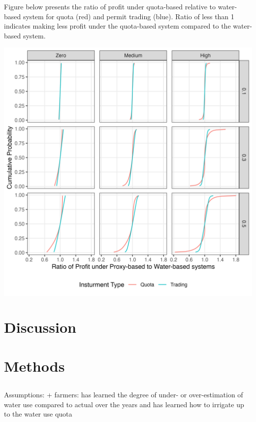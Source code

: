 \documentclass[
]{article}
\begin{document}
Figure below presents the ratio of profit under quota-based relative to water-based system for quota (red) and permit trading (blue). Ratio of less than 1 indicates making less profit under the quota-based system compared to the water-based system.

\begin{center}\includegraphics{figures/g_profit_ratio} \end{center}

\section{Discussion}\label{discussion}

\section{Methods}\label{methods}

\subsection{}\label{section}

Assumptions:
+ farmers: has learned the degree of under- or over-estimation of water use compared to actual over the years and has learned how to irrigate up to the water use quota
\end{document}
